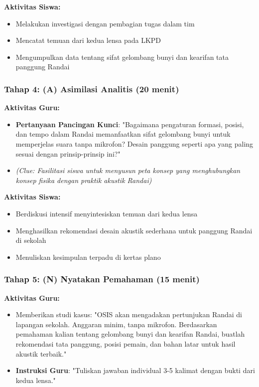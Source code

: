 \documentclass[12pt,a4paper]{article}
\begin{document}
\textbf{Aktivitas Siswa:}
\begin{itemize}
\item Melakukan investigasi dengan pembagian tugas dalam tim
\item Mencatat temuan dari kedua lensa pada LKPD
\item Mengumpulkan data tentang sifat gelombang bunyi dan kearifan tata panggung Randai
\end{itemize}

\subsubsection{Tahap 4: (A) Asimilasi Analitis (20 menit)}

\textbf{Aktivitas Guru:}
\begin{itemize}
\item \textbf{Pertanyaan Pancingan Kunci}: "Bagaimana pengaturan formasi, posisi, dan tempo dalam Randai memanfaatkan sifat gelombang bunyi untuk memperjelas suara tanpa mikrofon? Desain panggung seperti apa yang paling sesuai dengan prinsip-prinsip ini?"
\item \textit{(Clue: Fasilitasi siswa untuk menyusun peta konsep yang menghubungkan konsep fisika dengan praktik akustik Randai)}
\end{itemize}

\textbf{Aktivitas Siswa:}
\begin{itemize}
\item Berdiskusi intensif menyintesiskan temuan dari kedua lensa
\item Menghasilkan rekomendasi desain akustik sederhana untuk panggung Randai di sekolah
\item Menuliskan kesimpulan terpadu di kertas plano
\end{itemize}

\subsubsection{Tahap 5: (N) Nyatakan Pemahaman (15 menit)}

\textbf{Aktivitas Guru:}
\begin{itemize}
\item Memberikan studi kasus: "OSIS akan mengadakan pertunjukan Randai di lapangan sekolah. Anggaran minim, tanpa mikrofon. Berdasarkan pemahaman kalian tentang gelombang bunyi dan kearifan Randai, buatlah rekomendasi tata panggung, posisi pemain, dan bahan latar untuk hasil akustik terbaik."
\item \textbf{Instruksi Guru}: "Tuliskan jawaban individual 3-5 kalimat dengan bukti dari kedua lensa."
\end{itemize}
\end{document}
